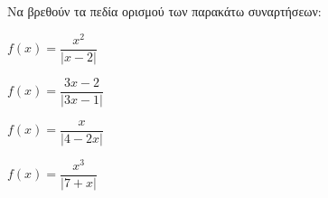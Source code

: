 Να βρεθούν τα πεδία ορισμού των παρακάτω συναρτήσεων:
\begin{alist}
\item $ f(x)=\dfrac{x^2}{|x-2|} $
\item $ f(x)=\dfrac{3x-2}{|3x-1|} $
\item $ f(x)=\dfrac{x}{|4-2x|} $
\item $ f(x)=\dfrac{x^3}{|7+x|} $
\end{alist}
